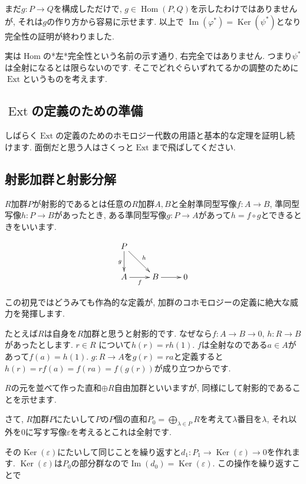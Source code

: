 \documentclass{jsarticle}
\newcommand{\makeop}[1]{\mathop{\mathrm{#1}}\nolimits}
\def\Im{\makeop{Im}}
\def\Ker{\makeop{Ker}}
\def\Hom{\makeop{Hom}}
\def\Ext{\makeop{Ext}}
\theoremstyle{definition}
\numberwithin{theorem}{section}
\begin{document}
まだ$g: P\rightarrow Q$を構成しただけで, $g\in\Hom(P, Q)$を示したわけではありませんが, それは$g$の作り方から容易に示せます. 以上で
$\Im(\varphi^*) = \Ker(\psi^*)$となり完全性の証明が終わりました.

実は$\Hom$の*左*完全性という名前の示す通り, 右完全ではありません. つまり$\psi^*$は全射になるとは限らないのです. そこでどれぐらいずれてるかの調整のために$\Ext$というものを考えます.

\subsection{$\Ext$の定義のための準備}
しばらく$\Ext$の定義のためのホモロジー代数の用語と基本的な定理を証明し続けます. 面倒だと思う人はさくっと$\Ext$まで飛ばしてください.

\subsection{射影加群と射影分解}
\label{sc:proj_module}
$R$加群$P$が射影的であるとは任意の$R$加群$A, B$と全射準同型写像$f: A\rightarrow B$, 準同型写像$h: P\rightarrow B$があったとき,
ある準同型写像$g: P\rightarrow A$があって$h = f\circ g$とできるときをいいます.

\begin{equation*}
\xymatrix{
  P \ar[dr]^h \ar[d]_g & \\
  A \ar[r]_f & B \ar[r] & 0
}
\end{equation*}

この初見ではどうみても作為的な定義が, 加群のコホモロジーの定義に絶大な威力を発揮します.

たとえば$R$は自身を$R$加群と思うと射影的です. なぜなら$f: A\rightarrow B\rightarrow 0$, $h: R \rightarrow B$があったとします.
$r\in R$ について$h(r) = rh(1)$. $f$は全射なのである$a\in A$があって$f(a) = h(1)$. $g:R \rightarrow A$を$g(r) = ra$と定義すると
$h(r) = rf(a) = f(ra) = f(g(r))$が成り立つからです.

$R$の元を並べて作った直和$\oplus R$自由加群といいますが, 同様にして射影的であることを示せます.

さて, $R$加群$P$にたいして$P$の$P$個の直和$\displaystyle P_0 = \bigoplus_{\lambda\in P} R$を考えて$\lambda$番目を$\lambda$, それ以外を0に写す写像$\varepsilon$を考えるとこれは全射です.

その$\Ker(\varepsilon)$にたいして同じことを繰り返すと$d_1: P_1 \rightarrow \Ker(\varepsilon) \rightarrow 0$を作れます.
$\Ker(\varepsilon)$は$P_0$の部分群なので$\Im(d_0) = \Ker(\varepsilon)$. この操作を繰り返すことで
\end{document}
